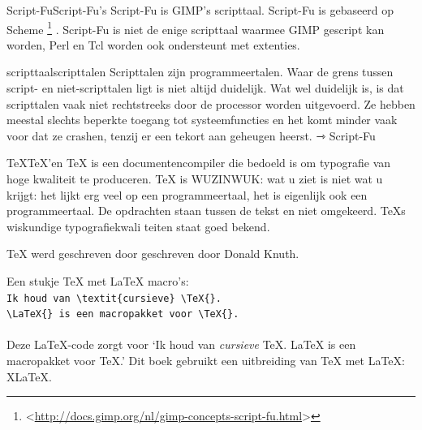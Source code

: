 \documentclass[11pt,a5paper,twoside]{book}
\newcommand{\BETEREURL}[1]{\mbox{<\url{#1}>}}
\begin{document}
\HLI
  \begin{WOORD}{Script-Fu}{Script-Fu’s}
   Script-Fu is GIMP’s scripttaal. Script-Fu is gebaseerd op Scheme%
    \footnote{\BETEREURL{http://docs.gimp.org/nl/gimp-concepts-script-fu.html}}%
   . Script-Fu is niet de enige scripttaal waarmee GIMP gescript kan worden,
    Perl en Tcl worden ook ondersteunt met extenties.
  \end{WOORD}
  \begin{WOORD}{scripttaal}{scripttalen}
   Scripttalen zijn programmeertalen. Waar de grens tussen script- en niet-scripttalen ligt
    is niet altijd duidelijk. Wat wel duidelijk is, is dat scripttalen vaak niet rechtstreeks
    door de processor worden uitgevoerd. Ze hebben meestal slechts beperkte toegang tot
    systeemfuncties en het komt minder vaak voor dat ze crashen, tenzij er een tekort aan
    geheugen heerst. ⇾ Script-Fu
  \end{WOORD}
\HLI
  \begin{WOORD}{TeX}{TeX’en}
   \TeX{} is een documentencompiler die bedoeld is om
    typografie van hoge kwaliteit te produceren. \TeX{} is
    WUZINWUK: wat u ziet is niet wat u krijgt: het lijkt erg
    veel op een programmeertaal, het is eigenlijk ook een
    programmeertaal. De opdrachten staan tussen de tekst
    en niet omgekeerd. \TeX{}s wiskundige typografiekwali%
    teiten staat goed bekend.

   \TeX{} werd geschreven door geschreven door Donald Knuth.

   Een stukje \TeX{} met \LaTeX{} macro’s:
   \\
   \verb+Ik houd van \textit{cursieve} \TeX{}.+\\
   \verb+\LaTeX{} is een macropakket voor \TeX{}.+\\
   \\
   Deze \LaTeX{}-code zorgt voor ‘Ik houd van \textit{cursieve}
    \TeX{}. \LaTeX{} is een macropakket voor \TeX{}.’
   Dit boek gebruikt een uitbreiding van \TeX{} met \LaTeX{}:
    \mbox{X\LaTeX{}}.
  \end{WOORD}
\HLI
\end{document}
